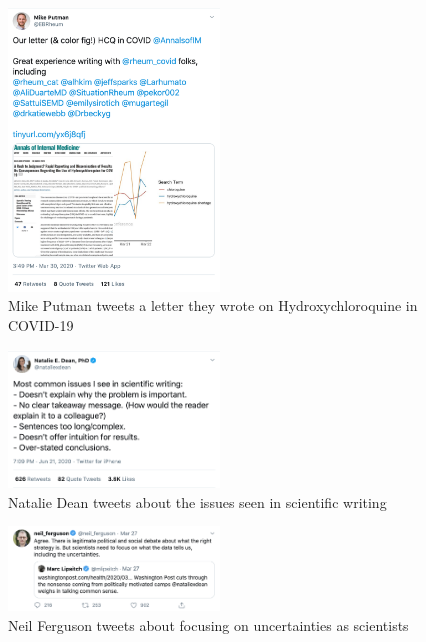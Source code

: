 \documentclass[acmsmall,authordraft]{acmart}
\begin{document}
\begin{figure}
  \includegraphics[width=0.5\textwidth]{Pictures/Appendix_Tweets/mike putman tweet.png}
  \caption{Mike Putman tweets a letter they wrote on Hydroxychloroquine in COVID-19}
  \label{mike_putman_tweet}
\end{figure}

\begin{figure}
  \includegraphics[width=0.5\textwidth]{Pictures/Appendix_Tweets/natalie dean tweet.png}
  \caption{Natalie Dean tweets about the issues seen in scientific writing}
  \label{natalie_dean_tweet}
\end{figure}

\begin{figure}
  \includegraphics[width=0.5\textwidth]{Pictures/Appendix_Tweets/neil ferguson tweet.png}
  \caption{Neil Ferguson tweets about focusing on uncertainties as scientists}
  \label{neil_fergusen}
\end{figure}
\end{document}
